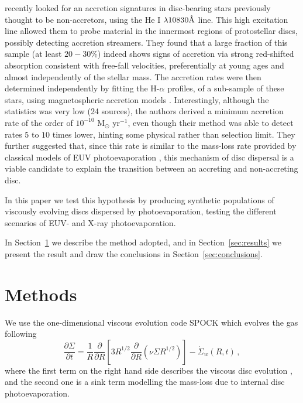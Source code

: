 \documentclass[fleqn,usenatbib,letters]{mnras}
\newcommand{\angstrom}{\mbox{\normalfont\AA}}
\begin{document}
\citet{Thanathibodee2022} recently looked for an accretion signatures in disc-bearing stars previously thought to be non-accretors, using the He I $\lambda10830 \angstrom$ line. This high excitation line allowed them to probe material in the innermost regions of protostellar discs, possibly detecting accretion streamers.
They found that a large fraction of this sample (at least $20-30\%$) indeed shows signs of accretion via strong red-shifted absorption consistent with free-fall velocities, preferentially at young ages and almost independently of the stellar mass.
The accretion rates were then determined independently by fitting the H-$\alpha$ profiles, of a sub-sample of these stars, using magnetospheric accretion models \citep{Thanathibodee2023}.
Interestingly, although the statistics was very low (24 sources), the authors derived a minimum accretion rate of the order of $10^{-10}$ M$_\odot$ yr$^{-1}$, even though their method was able to detect rates $5$ to $10$ times lower, hinting some physical rather than selection limit.
They further suggested that, since this rate is similar to the mass-loss rate provided by classical models of EUV photoevaporation \citep[see e.g.][]{Alexander2007}, this mechanism of disc dispersal is a viable candidate to explain the transition between an accreting and non-accreting disc.

In this paper we test this hypothesis by producing synthetic populations of viscously evolving discs dispersed by photoevaporation, testing the different scenarios of EUV- and X-ray photoevaporation. 

In Section~\ref{sec:methods} we describe the method adopted, and in Section~\ref{sec:results} we present the result and draw the conclusions in Section~\ref{sec:conclusions}.

\section{Methods}\label{sec:methods}

We use the one-dimensional viscous evolution code \textsc{SPOCK} \citep{Ercolano2015} which evolves the gas following
\begin{equation}
    \frac{\partial{\Sigma}}{\partial{t}} = \frac{1}{R}\frac{\partial}{\partial{R}}\left[3R^{1/2}\frac{\partial}{\partial{R}}(\nu\Sigma R^{1/2})\right] - \dot{\Sigma}_w(R,t)\,,
\end{equation}
where the first term on the right hand side describes the viscous disc evolution \citep{LyndenBell1974}, and the second one is a sink term modelling the mass-loss due to internal disc photoevaporation.
\end{document}
